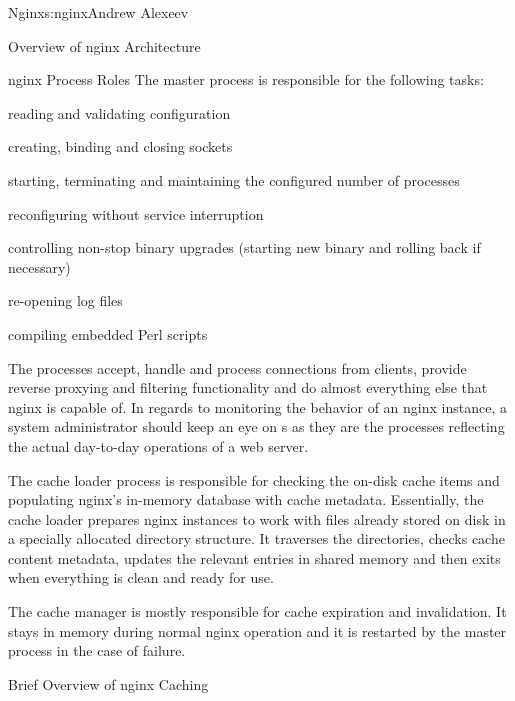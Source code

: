 \begin{aosachapter}{Nginx}{s:nginx}{Andrew Alexeev}
\begin{aosasect1}{Overview of nginx Architecture}
\begin{aosasect2}{nginx Process Roles}
The master process is responsible for the following tasks:

\begin{aosaitemize}

\item reading and validating configuration

\item creating, binding and closing sockets

\item starting, terminating and maintaining the configured number of
   processes

\item reconfiguring without service interruption

\item controlling non-stop binary upgrades (starting new binary and
rolling back if necessary)

\item re-opening log files

\item compiling embedded Perl scripts

\end{aosaitemize}

The  processes accept, handle and process connections
from clients, provide reverse proxying and filtering functionality and
do almost everything else that nginx is capable of. In regards to
monitoring the behavior of an nginx instance, a system administrator
should keep an eye on s as they are the processes
reflecting the actual day-to-day operations of a web server.

The cache loader process is responsible for checking the on-disk cache
items and populating nginx's in-memory database with cache
metadata. Essentially, the cache loader prepares nginx instances to
work with files already stored on disk in a specially allocated
directory structure. It traverses the directories, checks cache
content metadata, updates the relevant entries in shared memory and
then exits when everything is clean and ready for use.

The cache manager is mostly responsible for cache expiration and
invalidation. It stays in memory during normal nginx operation and it
is restarted by the master process in the case of failure.

\end{aosasect2}

\begin{aosasect2}{Brief Overview of nginx Caching}


\end{aosasect2}
\end{aosasect1}
\end{aosachapter}
